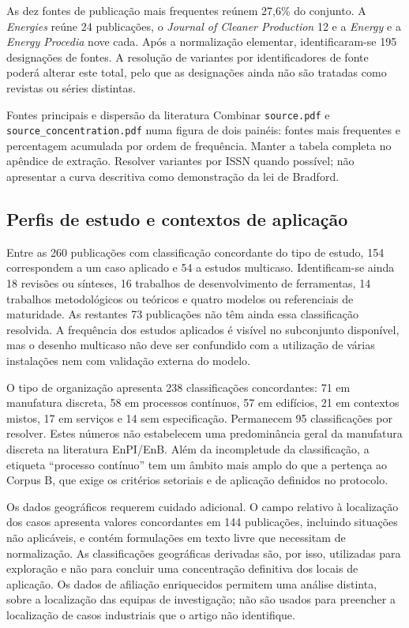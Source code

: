 As dez fontes de publicação mais frequentes reúnem 27,6\% do conjunto.
A \emph{Energies} reúne 24 publicações, o \emph{Journal of Cleaner
Production} 12 e a \emph{Energy} e a \emph{Energy Procedia} nove cada.
Após a normalização elementar, identificaram-se 195 designações de
fontes. A resolução de variantes por identificadores de fonte poderá
alterar este total, pelo que as designações ainda não são tratadas
como revistas ou séries distintas.

{Fontes principais e dispersão da literatura}
{Combinar \texttt{source.pdf} e \texttt{source\_concentration.pdf}
numa figura de dois painéis: fontes mais frequentes e percentagem
acumulada por ordem de frequência. Manter a tabela completa no
apêndice de extração. Resolver variantes por ISSN quando possível;
não apresentar a curva descritiva como demonstração da lei de Bradford.}%

\subsection{Perfis de estudo e contextos de aplicação}

Entre as 260 publicações com classificação concordante do tipo de
estudo, 154 correspondem a um caso aplicado e 54 a estudos multicaso.
Identificam-se ainda 18 revisões ou sínteses, 16 trabalhos de
desenvolvimento de ferramentas, 14 trabalhos metodológicos ou
teóricos e quatro modelos ou referenciais de maturidade. As restantes
73 publicações não têm ainda essa classificação resolvida. A
frequência dos estudos aplicados é visível no subconjunto disponível,
mas o desenho multicaso não deve ser confundido com a utilização de
várias instalações nem com validação externa do modelo.

O tipo de organização apresenta 238 classificações concordantes:
71 em manufatura discreta, 58 em processos contínuos, 57 em edifícios,
21 em contextos mistos, 17 em serviços e 14 sem especificação.
Permanecem 95 classificações por resolver. Estes números não
estabelecem uma predominância geral da manufatura discreta na
literatura EnPI/EnB. Além da incompletude da classificação, a etiqueta
``processo contínuo'' tem um âmbito mais amplo do que a pertença
ao Corpus B, que exige os critérios setoriais e de aplicação
definidos no protocolo.

Os dados geográficos requerem cuidado adicional. O campo relativo
à localização dos casos apresenta valores concordantes em 144
publicações, incluindo situações não aplicáveis, e contém
formulações em texto livre que necessitam de normalização.
As classificações geográficas derivadas são, por isso, utilizadas
para exploração e não para concluir uma concentração definitiva
dos locais de aplicação. Os dados de afiliação enriquecidos
permitem uma análise distinta, sobre a localização das equipas
de investigação; não são usados para preencher a localização
de casos industriais que o artigo não identifique.

